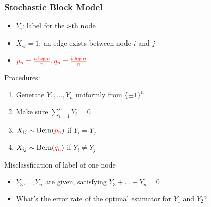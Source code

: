 \documentclass{beamer}
\DeclareMathOperator{\Bern}{Bern}
\newcommand\independent{\protect\mathpalette{\protect\independenT}{\perp}}
\def\independenT#1#2{\mathrel{\rlap{$#1#2$}\mkern2mu{#1#2}}}
\begin{document}

\begin{frame}
\frametitle{
Stochastic Block Model}
\begin{itemize}
\item $Y_i$: label for the $i$-th node
\item $X_{ij}=1$: an edge exists between node $i$ and $j$
\item $\color{red}  p_n=\frac{a \log n}{n}, q_n =\frac{b \log n}{n} $
\end{itemize}
Procedures:
\begin{enumerate}
\item Generate $Y_1, \dots, Y_n$ uniformly from $\{\pm 1\}^n$
\item Make sure $\sum_{i=1}^n Y_i = 0$
\item $X_{ij} \sim \Bern(\textcolor{red} {p_n} ) $ if $Y_i=Y_j$
\item $X_{ij} \sim \Bern(\textcolor{red}{q_n} ) $ if $Y_i \neq Y_j$
\end{enumerate}
Misclassfication of label of one node
\begin{itemize}
\item $Y_3, \dots, Y_n$ are given, satisfying $Y_3 + \dots + Y_n  = 0$
\item What's the error rate of the optimal estimator for $Y_1$ and $Y_2$?
\end{itemize}
\end{frame}
\end{document}
